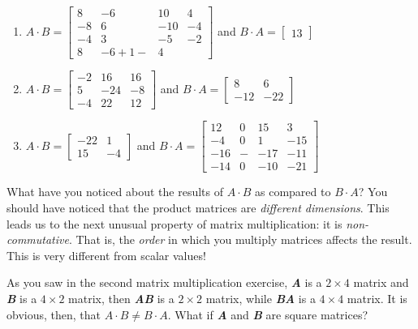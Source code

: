 \begin{Answer}[ref = mult_mat2]
\begin{enumerate}
\item $\mathbf{\mathit{A}} \cdot \mathbf{\mathit{B}} = \begin{bmatrix}
8 & -6 & 10 & 4\\
-8 & 6 & -10 & -4\\
-4 & 3 & -5 & -2\\
8 & -6 + 1- & 4
\end{bmatrix}$ and $\mathbf{\mathit{B}} \cdot \mathbf{\mathit{A}} = 
\begin{bmatrix}
13
\end{bmatrix}$
\item $\mathbf{\mathit{A}} \cdot \mathbf{\mathit{B}} = \begin{bmatrix}
-2 & 16 & 16\\
5 & -24 & -8\\
-4 & 22 & 12
\end{bmatrix}$ and $\mathbf{\mathit{B}} \cdot \mathbf{\mathit{A}} = 
\begin{bmatrix}
8 & 6\\
-12 & -22
\end{bmatrix}$
\item $\mathbf{\mathit{A}} \cdot \mathbf{\mathit{B}} = \begin{bmatrix}
-22 & 1\\
15 & -4
\end{bmatrix}$ and $\mathbf{\mathit{B}} \cdot \mathbf{\mathit{A}} = 
\begin{bmatrix}
12 & 0 & 15 & 3\\
-4 & 0 & 1 & -15\\
-16 & - & -17 & -11\\
-14 & 0 & -10 & -21
\end{bmatrix}$
\end{enumerate}
\end{Answer}

What have you noticed about the results of $\mathbf{\mathit{A}} \cdot 
\mathbf{\mathit{B}}$ as compared to $\mathbf{\mathit{B}} \cdot \mathbf{
\mathit{A}}$? You should have noticed that the product matrices are 
\textit{different dimensions}. This leads us to the next unusual property of 
matrix multiplication: it is \textit{non-commutative}. That is, the \textit{
order} in which you multiply matrices affects the result. This is very 
different from scalar values! 

As you saw in the second matrix multiplication exercise, \textbf{\textit{A}} 
is a $2 \times 4$ matrix and \textbf{\textit{B}} is a $4 \times 2$ matrix, 
then \textbf{\textit{A}}\textbf{\textit{B}} is a $2 \times 2$ matrix, while 
\textbf{\textit{B}}\textbf{\textit{A}} is a $4 \times 4$ matrix. It is obvious, 
then, that $\mathbf{\mathit{A}} \cdot \mathbf{\mathit{B}} \neq \mathbf{\mathit{
B}} \cdot \mathbf{\mathit{A}}$. What if \textbf{\textit{A}} and \textbf{\textit{
B}} are square matrices?

